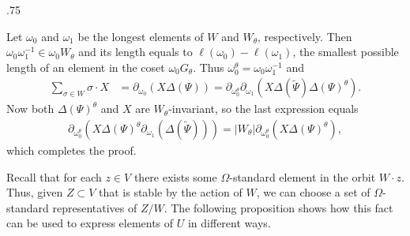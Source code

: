 \documentclass[11pt,fleqn]{amsart}
\makeatletter
\renewcommand\proofname{Proof}
\renewenvironment{proof}[1][\textit{\proofname}]{\par
 \pushQED{\qed}%
 \normalfont \topsep.75\paraskip\relax
 \trivlist
 \item[\hskip\labelsep
 \itshape
 #1\@addpunct{.}]\ignorespaces
}{%
 \popQED\endtrivlist\@endpefalse
}
\newcounter{para}[section]
\makeatother
\begin{document}
\begin{proof}
Let $\omega_0$ and $\omega_1$ be the longest elements of $W$ and $W_\theta$, 
respectively. Then $\omega_0 \omega_1^{-1} \in \omega_0 W_\theta$ and its 
length equals to $\ell(\omega_0) - \ell(\omega_1)$,  the 
smallest possible length of an element in the coset $\omega_0 G_\theta$. Thus 
$\omega_0^\theta = \omega_0 \omega_1^{-1}$ and
\begin{align*}
\sum_{\sigma \in W} \sigma \cdot X 
	&=\partial_{\omega_0}(X \Delta(\Psi))
	= \partial_{\omega^\theta_0} \partial_{\omega_1}(X \Delta(\widetilde \Psi) 
	\Delta(\Psi)^\theta).
\end{align*}
Now both $\Delta(\Psi)^\theta$ and $X$ are $W_\theta$-invariant, so the last 
expression equals
\begin{align*}
\partial_{\omega^\theta_0}(
	X \Delta(\Psi)^\theta \partial_{\omega_1}(
		\Delta(\widetilde \Psi)))
	= |W_\theta| \partial_{\omega^\theta_0}(X \Delta(\Psi)^\theta),
\end{align*}
which completes the proof.
\end{proof}

Recall that for each $z \in V$ there exists some $\Omega$-standard element in 
the orbit $W \cdot z$. Thus, given $Z \subset V$ that is stable by the action of $W$, we 
can choose a set of $\Omega$-standard representatives of $Z/W$. The following
proposition shows how this fact can be used to express
elements of $U$ in different ways.
\end{document}
